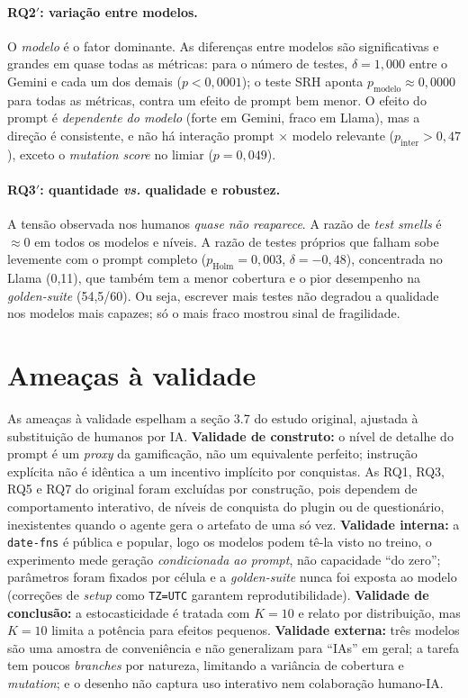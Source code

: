 \documentclass[12pt]{article}
\begin{document}
\paragraph{RQ2$'$: variação entre modelos.} O \emph{modelo} é o fator
dominante. As diferenças entre modelos são significativas e grandes em quase
todas as métricas: para o número de testes, $\delta = 1{,}000$ entre o Gemini e
cada um dos demais ($p < 0{,}0001$); o teste SRH aponta $p_{\text{modelo}} \approx
0{,}0000$ para todas as métricas, contra um efeito de prompt bem menor. O efeito
do prompt é \emph{dependente do modelo} (forte em Gemini, fraco em Llama), mas a
direção é consistente, e não há interação prompt $\times$ modelo relevante
($p_{\text{inter}} > 0{,}47$), exceto o \emph{mutation score} no limiar
($p = 0{,}049$).

\paragraph{RQ3$'$: quantidade \emph{vs.} qualidade e robustez.} A tensão
observada nos humanos \emph{quase não reaparece}. A razão de \emph{test smells} é
$\approx 0$ em todos os modelos e níveis. A razão de testes próprios que falham
sobe levemente com o prompt completo ($p_{\text{Holm}} = 0{,}003$,
$\delta = -0{,}48$), concentrada no Llama (0{,}11), que também tem a menor
cobertura e o pior desempenho na \emph{golden-suite} (54,5/60). Ou seja, escrever
mais testes não degradou a qualidade nos modelos mais capazes; só o mais fraco
mostrou sinal de fragilidade.

\section{Ameaças à validade}

As ameaças à validade espelham a seção 3.7 do estudo original, ajustada à substituição de humanos por IA.
\textbf{Validade de construto:} o nível de detalhe do prompt é um \emph{proxy} da
gamificação, não um equivalente perfeito; instrução explícita não é idêntica a um
incentivo implícito por conquistas. As RQ1, RQ3, RQ5 e RQ7 do original foram
excluídas por construção, pois dependem de comportamento interativo, de níveis de
conquista do plugin ou de questionário, inexistentes quando o agente gera o
artefato de uma só vez. \textbf{Validade interna:} a \texttt{date-fns} é pública e
popular, logo os modelos podem tê-la visto no treino, o experimento mede geração
\emph{condicionada ao prompt}, não capacidade ``do zero''; parâmetros foram
fixados por célula e a \emph{golden-suite} nunca foi exposta ao modelo (correções
de \emph{setup} como \texttt{TZ=UTC} garantem reprodutibilidade).
\textbf{Validade de conclusão:} a estocasticidade é tratada com $K=10$ e relato
por distribuição, mas $K=10$ limita a potência para efeitos pequenos.
\textbf{Validade externa:} três modelos são uma amostra de conveniência e não
generalizam para ``IAs'' em geral; a tarefa tem poucos \emph{branches} por
natureza, limitando a variância de cobertura e \emph{mutation}; e o desenho não
captura uso interativo nem colaboração humano-IA.
\end{document}
